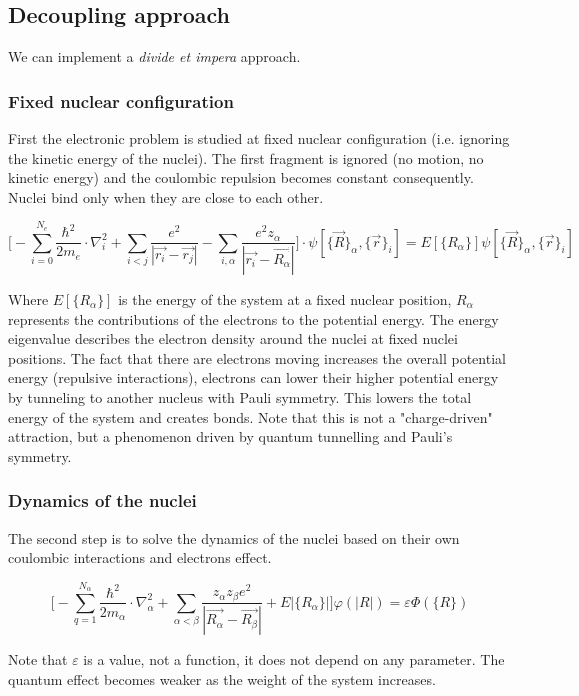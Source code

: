 	\subsection{Decoupling approach}
	We can implement a \textit{divide et impera} approach.

		\subsubsection{Fixed nuclear configuration}
		First the electronic problem is studied at fixed nuclear configuration (i.e. ignoring the kinetic energy of the nuclei).
		The first fragment is ignored (no motion, no kinetic energy) and the coulombic repulsion becomes constant consequently.
		Nuclei bind only when they are close to each other.

		$$\bigg[-\sum_{i=0}^{N_e}\frac{\hbar^2}{2m_e}\cdot\nabla^2_i+\sum_{i<j}\frac{e^2}{|\vec{r_i}-\vec{r_j}|}-\sum_{i,\alpha}\frac{e^2z_{\alpha}}{|\vec{r_i}-\vec{R_{\alpha}}|}\bigg]\cdot\psi[\{\vec{R}\}_{\alpha},\{\vec{r}\}_i] =E[\{R_{\alpha}\}]\psi[\{\vec{R}\}_{\alpha},\{\vec{r}\}_i]$$

		Where $E[\{R_{\alpha}\}]$ is the energy of the system at a fixed nuclear position, ${R_{\alpha}}$ represents the contributions of the electrons to the potential energy.
		The energy eigenvalue describes the electron density around the nuclei at fixed nuclei positions.
		The fact that there are electrons moving increases the overall potential energy (repulsive interactions), electrons can lower their higher potential energy by tunneling to another nucleus with Pauli symmetry.
		This lowers the total energy of the system and creates bonds.
		Note that this is not a "charge-driven" attraction, but a phenomenon driven by quantum tunnelling and Pauli's symmetry.

		\subsubsection{Dynamics of the nuclei}
		The second step is to solve the dynamics of the nuclei based on their own coulombic interactions and electrons effect.

		$$\bigg[-\sum_{q=1}^{N_{\alpha}}\frac{\hbar^2}{2m_{\alpha}}\cdot\nabla_{\alpha}^2+\sum_{\alpha<\beta}\frac{z_{\alpha}z_{\beta}e^2}{|\vec{R_{\alpha}}-\vec{R_{\beta}}|}+E|\{R_\alpha\}| \bigg]\varphi(|R|)=\varepsilon\varPhi(\{R\})$$

		Note that $\varepsilon$ is a value, not a function, it does not depend on any parameter.
		The quantum effect becomes weaker as the weight of the system increases.

